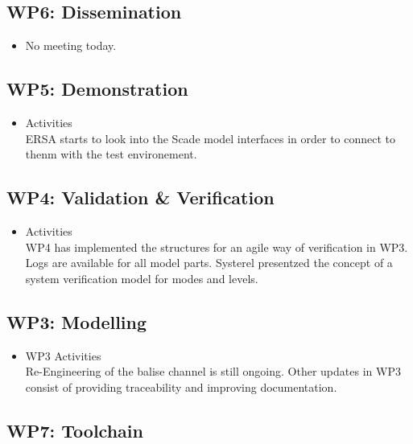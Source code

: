 \documentclass[a4paper, 11pt]{article}
\begin{document}
\subsection{WP6: Dissemination}
\begin{itemize}

\item No meeting today.
\end{itemize}

\subsection{WP5: Demonstration}

\begin{itemize}
\item Activities\\
ERSA starts to look into the Scade model interfaces in order to connect to thenm with the test environement.

\end{itemize}

\subsection{WP4: Validation \& Verification}
\begin{itemize}
\item Activities\\
WP4 has implemented the structures for an agile way of verification in WP3. Logs are available for all model parts. 
Systerel presentzed the concept of a system verification model for modes and levels.
\end{itemize}

\subsection{WP3: Modelling}

\begin{itemize}
\item WP3 Activities\\
Re-Engineering of the balise channel is still ongoing.
Other updates in WP3 consist of providing  traceability and improving documentation.

\end{itemize}

\subsection{WP7: Toolchain}
\end{document}
